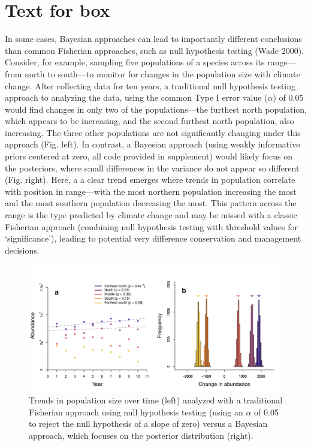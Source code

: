 \documentclass[11pt]{article}
\begin{document}
\newpage
\section*{Text for box}

In some cases, Bayesian approaches can lead to importantly different conclusions than common Fisherian approaches, such as null hypothesis testing (Wade 2000). Consider, for example, sampling five populations of a species across its range---from north to south---to monitor for changes in the population size with climate change. After collecting data for ten years, a traditional null hypothesis testing approach to analyzing the data, using the common Type I error value ($\alpha$) of 0.05 would find changes in only two of the populations---the furthest north population, which appears to be increasing, and the second furthest north population, also increasing. The three other populations are not significantly changing under this approach (Fig.  left). In contrast, a Bayesian approach (using weakly informative priors centered at zero, all code provided in supplement) would likely focus on the posteriors, where small differences in the variance do not appear so different  (Fig.  right). Here, a a clear trend emerges where trends in population correlate with position in range---with the most northern population increasing the most and the most southern population decreasing the most. This pattern across the range is the type predicted by climate change and may be missed with a classic Fisherian approach (combining null hypothesis testing with threshold values for `significance'), leading to potential very difference conservation and management decisions. %

\begin{figure}
\includegraphics[width=1\textwidth]{figures/nhtBoxLayeredMeans.pdf}
\caption{Trends in population size over time (left) analyzed with a traditional Fisherian approach using null hypothesis testing (using an $\alpha$ of 0.05 to reject the null hypothesis of a slope of zero) versus a Bayesian approach, which focuses on the posterior distribution (right).}
\label{fig:nht}
\end{figure}
\end{document}
